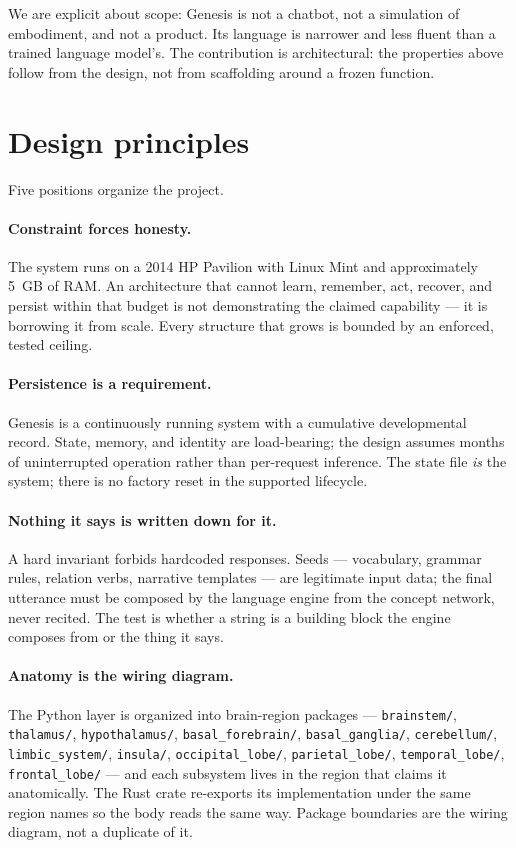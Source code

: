 \documentclass[11pt]{article}
\newcommand{\code}[1]{\texttt{\small #1}}
\begin{document}
We are explicit about scope: Genesis is not a chatbot, not a simulation
of embodiment, and not a product. Its language is narrower and less
fluent than a trained language model's. The contribution is
architectural: the properties above follow from the design, not from
scaffolding around a frozen function.

\section{Design principles}

Five positions organize the project.

\paragraph{Constraint forces honesty.} The system runs on a 2014 HP
Pavilion with Linux Mint and approximately 5~GB of RAM. An architecture
that cannot learn, remember, act, recover, and persist within that
budget is not demonstrating the claimed capability --- it is borrowing
it from scale. Every structure that grows is bounded by an enforced,
tested ceiling.

\paragraph{Persistence is a requirement.} Genesis is a continuously
running system with a cumulative developmental record. State, memory,
and identity are load-bearing; the design assumes months of
uninterrupted operation rather than per-request inference. The state
file \emph{is} the system; there is no factory reset in the supported
lifecycle.

\paragraph{Nothing it says is written down for it.} A hard invariant
forbids hardcoded responses. Seeds --- vocabulary, grammar rules,
relation verbs, narrative templates --- are legitimate input data; the
final utterance must be composed by the language engine from the
concept network, never recited. The test is whether a string is a
building block the engine composes from or the thing it says.

\paragraph{Anatomy is the wiring diagram.} The Python layer is organized
into brain-region packages --- \code{brainstem/}, \code{thalamus/},
\code{hypothalamus/}, \code{basal\_forebrain/}, \code{basal\_ganglia/},
\code{cerebellum/}, \code{limbic\_system/}, \code{insula/},
\code{occipital\_lobe/}, \code{parietal\_lobe/}, \code{temporal\_lobe/},
\code{frontal\_lobe/} --- and each subsystem lives in the region that
claims it anatomically. The Rust crate re-exports its implementation
under the same region names so the body reads the same way. Package
boundaries are the wiring diagram, not a duplicate of it.
\end{document}
